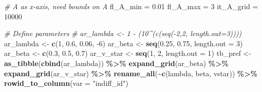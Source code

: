 \documentclass[
]{book}
\newenvironment{Shaded}{\begin{snugshade}}{\end{snugshade}}
\newcommand{\CommentTok}[1]{\textcolor[rgb]{0.56,0.35,0.01}{\textit{#1}}}
\newcommand{\DataTypeTok}[1]{\textcolor[rgb]{0.13,0.29,0.53}{#1}}
\newcommand{\DecValTok}[1]{\textcolor[rgb]{0.00,0.00,0.81}{#1}}
\newcommand{\FloatTok}[1]{\textcolor[rgb]{0.00,0.00,0.81}{#1}}
\newcommand{\KeywordTok}[1]{\textcolor[rgb]{0.13,0.29,0.53}{\textbf{#1}}}
\newcommand{\NormalTok}[1]{#1}
\newcommand{\OperatorTok}[1]{\textcolor[rgb]{0.81,0.36,0.00}{\textbf{#1}}}
\newcommand{\StringTok}[1]{\textcolor[rgb]{0.31,0.60,0.02}{#1}}
\begin{document}
\begin{Shaded}
\begin{Highlighting}[]
\CommentTok{\# A as x{-}axis, need bounds on A}
\NormalTok{fl\_A\_min =}\StringTok{ }\FloatTok{0.01}
\NormalTok{fl\_A\_max =}\StringTok{ }\DecValTok{3}
\NormalTok{it\_A\_grid =}\StringTok{ }\DecValTok{10000}

\CommentTok{\# Define parameters}
\CommentTok{\# ar\_lambda \textless{}{-} 1 {-} (10\^{}(c(seq({-}2,2, length.out=3))))}
\NormalTok{ar\_lambda \textless{}{-}}\StringTok{ }\KeywordTok{c}\NormalTok{(}\DecValTok{1}\NormalTok{, }\FloatTok{0.6}\NormalTok{, }\FloatTok{0.06}\NormalTok{, }\DecValTok{{-}6}\NormalTok{)}
\NormalTok{ar\_beta \textless{}{-}}\StringTok{ }\KeywordTok{seq}\NormalTok{(}\FloatTok{0.25}\NormalTok{, }\FloatTok{0.75}\NormalTok{, }\DataTypeTok{length.out =} \DecValTok{3}\NormalTok{)}
\NormalTok{ar\_beta \textless{}{-}}\StringTok{ }\KeywordTok{c}\NormalTok{(}\FloatTok{0.3}\NormalTok{, }\FloatTok{0.5}\NormalTok{, }\FloatTok{0.7}\NormalTok{)}
\NormalTok{ar\_v\_star \textless{}{-}}\StringTok{ }\KeywordTok{seq}\NormalTok{(}\DecValTok{1}\NormalTok{, }\DecValTok{2}\NormalTok{, }\DataTypeTok{length.out =} \DecValTok{1}\NormalTok{)}
\NormalTok{tb\_pref \textless{}{-}}\StringTok{ }\KeywordTok{as\_tibble}\NormalTok{(}\KeywordTok{cbind}\NormalTok{(ar\_lambda)) }\OperatorTok{\%\textgreater{}\%}\StringTok{ }
\StringTok{  }\KeywordTok{expand\_grid}\NormalTok{(ar\_beta) }\OperatorTok{\%\textgreater{}\%}\StringTok{ }\KeywordTok{expand\_grid}\NormalTok{(ar\_v\_star) }\OperatorTok{\%\textgreater{}\%}\StringTok{ }
\StringTok{  }\KeywordTok{rename\_all}\NormalTok{(}\OperatorTok{\textasciitilde{}}\KeywordTok{c}\NormalTok{(}\StringTok{\textquotesingle{}lambda\textquotesingle{}}\NormalTok{, }\StringTok{\textquotesingle{}beta\textquotesingle{}}\NormalTok{, }\StringTok{\textquotesingle{}vstar\textquotesingle{}}\NormalTok{)) }\OperatorTok{\%\textgreater{}\%}\StringTok{ }
\StringTok{  }\KeywordTok{rowid\_to\_column}\NormalTok{(}\DataTypeTok{var =} \StringTok{"indiff\_id"}\NormalTok{)}


\end{Highlighting}
\end{Shaded}
\end{document}
